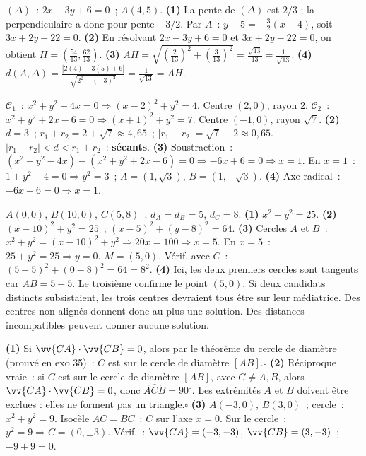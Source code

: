 
$(\Delta)$~: $2x-3y+6=0$~; $A(4,5)$.
\textbf{(1)} La pente de $(\Delta)$ est $2/3$ ; la perpendiculaire a donc
pour pente $-3/2$. Par $A$~:
$y-5=-\frac32(x-4)$, soit $3x+2y-22=0$.
\textbf{(2)} En r\'esolvant $2x-3y+6=0$ et $3x+2y-22=0$, on obtient
$H=\left(\frac{54}{13},\frac{62}{13}\right)$.
\textbf{(3)} $AH=\sqrt{\left(\frac{2}{13}\right)^2+\left(\frac{3}{13}\right)^2}
=\frac{\sqrt{13}}{13}=\frac{1}{\sqrt{13}}$.
\textbf{(4)} $d(A,\Delta)=\frac{|2(4)-3(5)+6|}{\sqrt{2^2+(-3)^2}}
=\frac{1}{\sqrt{13}}=AH$.\checkmark


$\mathcal{C}_1$~: $x^2+y^2-4x=0\Rightarrow(x-2)^2+y^2=4$. Centre $(2,0)$, rayon $2$.
$\mathcal{C}_2$~: $x^2+y^2+2x-6=0\Rightarrow(x+1)^2+y^2=7$. Centre $(-1,0)$, rayon $\sqrt{7}$.
\textbf{(2)} $d=3$~; $r_1+r_2=2+\sqrt{7}\approx4{,}65$~; $|r_1-r_2|=\sqrt{7}-2\approx0{,}65$.
$|r_1-r_2|<d<r_1+r_2$~: \textbf{s\'ecants}.
\textbf{(3)} Soustraction~: $(x^2+y^2-4x)-(x^2+y^2+2x-6)=0\Rightarrow-6x+6=0\Rightarrow x=1$.
En $x=1$~: $1+y^2-4=0\Rightarrow y^2=3$~; $A=(1,\sqrt{3})$, $B=(1,-\sqrt{3})$.
\textbf{(4)} Axe radical~: $-6x+6=0\Rightarrow x=1$.\checkmark


$A(0,0)$, $B(10,0)$, $C(5,8)$~; $d_A=d_B=5$, $d_C=8$.
\textbf{(1)} $x^2+y^2=25$.
\textbf{(2)} $(x-10)^2+y^2=25$~; $(x-5)^2+(y-8)^2=64$.
\textbf{(3)} Cercles $A$ et $B$~: $x^2+y^2=(x-10)^2+y^2\Rightarrow20x=100\Rightarrow x=5$.
En $x=5$~: $25+y^2=25\Rightarrow y=0$. $M=(5,0)$.
V\'erif. avec $C$~: $(5-5)^2+(0-8)^2=64=8^2$.\checkmark
\textbf{(4)} Ici, les deux premiers cercles sont tangents car $AB=5+5$.
Le troisi\`eme confirme le point $(5,0)$.
Si deux candidats distincts subsistaient, les trois centres devraient tous
\^etre sur leur m\'ediatrice. Des centres non align\'es donnent donc au plus une
solution. Des distances incompatibles peuvent donner aucune solution.


\textbf{(1)} Si $\vv{CA}\cdot\vv{CB}=0$, alors par le th\'eor\`eme du cercle de diam\`etre
(prouv\'e en exo 35)~: $C$ est sur le cercle de diam\`etre $[AB]$.\hfill$\square$
\textbf{(2)} R\'eciproque vraie~: si $C$ est sur le cercle de diam\`etre $[AB]$,
avec $C\ne A,B$, alors $\vv{CA}\cdot\vv{CB}=0$, donc $\hat{ACB}=90^{\circ}$.
Les extr\'emit\'es $A$ et $B$ doivent \^etre exclues : elles ne forment pas un triangle.\hfill$\square$
\textbf{(3)} $A(-3,0)$, $B(3,0)$~; cercle~: $x^2+y^2=9$.
Isoc\`ele $AC=BC$~: $C$ sur l'axe $x=0$. Sur le cercle~: $y^2=9\Rightarrow C=(0,\pm3)$.
V\'erif.~: $\vv{CA}=(-3,-3)$, $\vv{CB}=(3,-3)$~; $-9+9=0$.\checkmark

